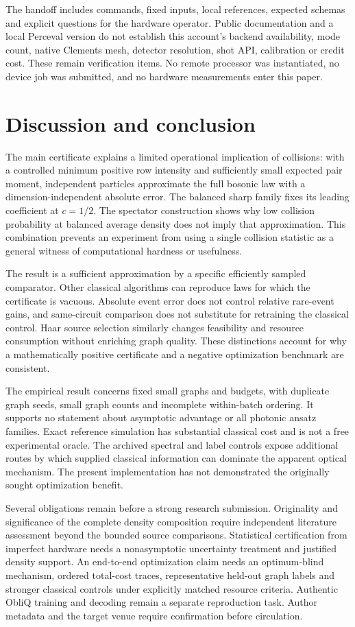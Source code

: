 \documentclass[11pt,a4paper]{article}
\theoremstyle{remark}\newtheorem{remark}[theorem]{Remark}
\begin{document}
The handoff includes commands, fixed inputs, local references, expected schemas and explicit questions for the hardware operator. Public documentation and a local Perceval version do not establish this account's backend availability, mode count, native Clements mesh, detector resolution, shot API, calibration or credit cost. These remain verification items. No remote processor was instantiated, no device job was submitted, and no hardware measurements enter this paper.

\section{Discussion and conclusion}\label{sec:discussion}
The main certificate explains a limited operational implication of collisions: with a controlled minimum positive row intensity and sufficiently small expected pair moment, independent particles approximate the full bosonic law with a dimension-independent absolute error. The balanced sharp family fixes its leading coefficient at $c=1/2$. The spectator construction shows why low collision probability at balanced average density does not imply that approximation. This combination prevents an experiment from using a single collision statistic as a general witness of computational hardness or usefulness.

The result is a sufficient approximation by a specific efficiently sampled comparator. Other classical algorithms can reproduce laws for which the certificate is vacuous. Absolute event error does not control relative rare-event gains, and same-circuit comparison does not substitute for retraining the classical control. Haar source selection similarly changes feasibility and resource consumption without enriching graph quality. These distinctions account for why a mathematically positive certificate and a negative optimization benchmark are consistent.

The empirical result concerns fixed small graphs and budgets, with duplicate graph seeds, small graph counts and incomplete within-batch ordering. It supports no statement about asymptotic advantage or all photonic ansatz families. Exact reference simulation has substantial classical cost and is not a free experimental oracle. The archived spectral and label controls expose additional routes by which supplied classical information can dominate the apparent optical mechanism. The present implementation has not demonstrated the originally sought optimization benefit.

Several obligations remain before a strong research submission. Originality and significance of the complete density composition require independent literature assessment beyond the bounded source comparisons. Statistical certification from imperfect hardware needs a nonasymptotic uncertainty treatment and justified density support. An end-to-end optimization claim needs an optimum-blind mechanism, ordered total-cost traces, representative held-out graph labels and stronger classical controls under explicitly matched resource criteria. Authentic ObliQ training and decoding remain a separate reproduction task. Author metadata and the target venue require confirmation before circulation.
\end{document}

